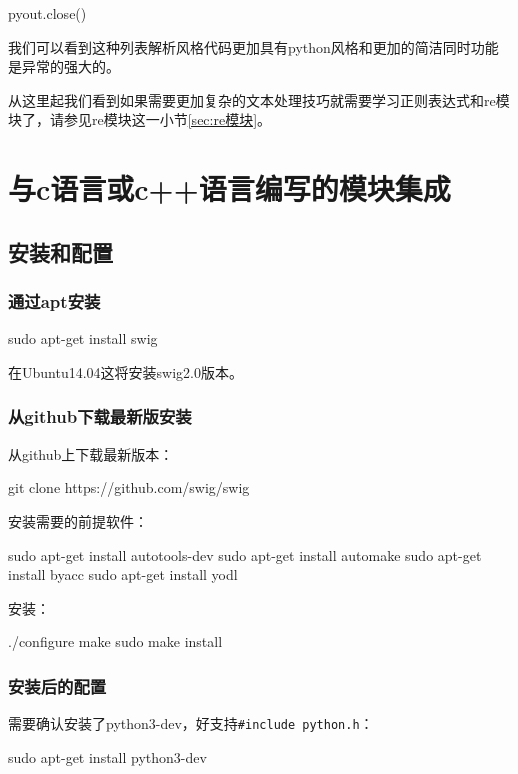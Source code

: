 \documentclass[12pt,oneside]{book}
\begin{document}
\begin{common-format}
\begin{tcbpython}
pyout.close()
\end{tcbpython}

我们可以看到这种列表解析风格代码更加具有python风格和更加的简洁同时功能是异常的强大的。

从这里起我们看到如果需要更加复杂的文本处理技巧就需要学习正则表达式和re模块了，请参见re模块这一小节\ref{sec:re模块}。





\chapter{与c语言或c++语言编写的模块集成}
\section{安装和配置}
\subsection{通过apt安装}
\begin{tcbbash}[]
sudo apt-get install swig
\end{tcbbash}

在Ubuntu14.04这将安装swig2.0版本。

\subsection{从github下载最新版安装}
从github上下载最新版本：
\begin{tcbbash}[]
git  clone  https://github.com/swig/swig
\end{tcbbash}

安装需要的前提软件：
\begin{tcbbash}[]
sudo apt-get install autotools-dev
sudo apt-get install automake
sudo apt-get install byacc
sudo apt-get install yodl
\end{tcbbash}

安装：
\begin{tcbbash}[]
./configure
make
sudo make install
\end{tcbbash}

\subsection{安装后的配置}
需要确认安装了python3-dev，好支持\verb+#include python.h+：
\begin{tcbbash}[]
sudo apt-get install python3-dev
\end{tcbbash}


\end{common-format}
\end{document}
